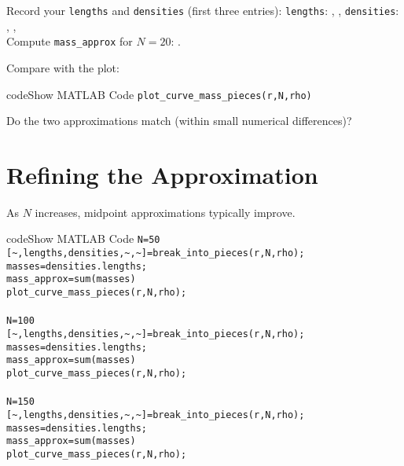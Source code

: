 \documentclass{ximera}
\begin{document}
\begin{problem}
Record your \texttt{lengths} and \texttt{densities} (first three entries):  
\texttt{lengths}: , ,  \quad
\texttt{densities}: , , \\
Compute \texttt{mass\_approx} for \(N=20\): .
\end{problem}

Compare with the plot:

\begin{expandable}{code}{Show MATLAB Code}
\texttt{plot\_curve\_mass\_pieces(r,\;N,\;rho)}
\end{expandable}

\begin{problem}
Do the two approximations match (within small numerical differences)? 
\end{problem}

\section*{Refining the Approximation}

As \(N\) increases, midpoint approximations typically improve.

\begin{expandable}{code}{Show MATLAB Code}
\texttt{N=50}\\
\texttt{[\textasciitilde,\;lengths,\;densities,\;\textasciitilde,\;\textasciitilde]\;=\;break\_into\_pieces(r,\;N,\;rho);}\\
\texttt{masses\;=\;densities\;.\*\;lengths;}\\
\texttt{mass\_approx\;=\;sum(masses)}\\
\texttt{plot\_curve\_mass\_pieces(r,\;N,\;rho);}\\
\\
\texttt{N=100}\\
\texttt{[\textasciitilde,\;lengths,\;densities,\;\textasciitilde,\;\textasciitilde]\;=\;break\_into\_pieces(r,\;N,\;rho);}\\
\texttt{masses\;=\;densities\;.\*\;lengths;}\\
\texttt{mass\_approx\;=\;sum(masses)}\\
\texttt{plot\_curve\_mass\_pieces(r,\;N,\;rho);}\\
\\
\texttt{N=150}\\
\texttt{[\textasciitilde,\;lengths,\;densities,\;\textasciitilde,\;\textasciitilde]\;=\;break\_into\_pieces(r,\;N,\;rho);}\\
\texttt{masses\;=\;densities\;.\*\;lengths;}\\
\texttt{mass\_approx\;=\;sum(masses)}\\
\texttt{plot\_curve\_mass\_pieces(r,\;N,\;rho);}
\end{expandable}
\end{document}
